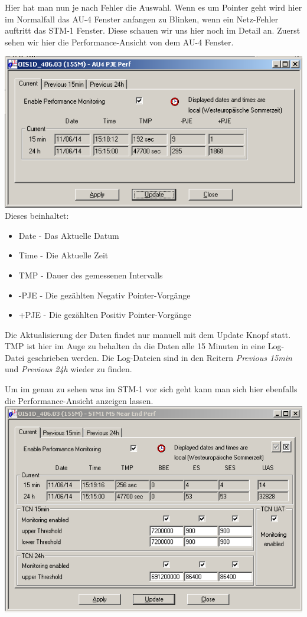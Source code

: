 Hier hat man nun je nach Fehler die Auswahl. Wenn es um Pointer geht wird hier im Normalfall das AU-4 Fenster anfangen zu Blinken, wenn ein Netz-Fehler auftritt das STM-1 Fenster.
Diese schauen wir uns hier noch im Detail an.
Zuerst sehen wir hier die Performance-Ansicht von dem AU-4 Fenster.

\includegraphics[scale=1]{sdh/Pointerview_detail.bmp} 
Dieses beinhaltet:

\begin{itemize}
\item Date - Das Aktuelle Datum
\item Time - Die Aktuelle Zeit
\item TMP - Dauer des gemessenen Intervalls
\item -PJE - Die gezählten Negativ Pointer-Vorgänge
\item +PJE - Die gezählten Positiv Pointer-Vorgänge
\end{itemize}

Die Aktualisierung der Daten findet nur manuell mit dem Update Knopf statt. TMP ist hier im Auge zu behalten da die Daten alle 15 Minuten in eine Log-Datei geschrieben werden. Die Log-Dateien sind in den Reitern \textit{Previous 15min} und \textit{Previous 24h} wieder zu finden. 

Um im genau zu sehen was im STM-1 vor sich geht kann man sich hier ebenfalls die Performance-Ansicht anzeigen lassen. 
\includegraphics[scale=1]{sdh/ms-near-end.bmp} 

